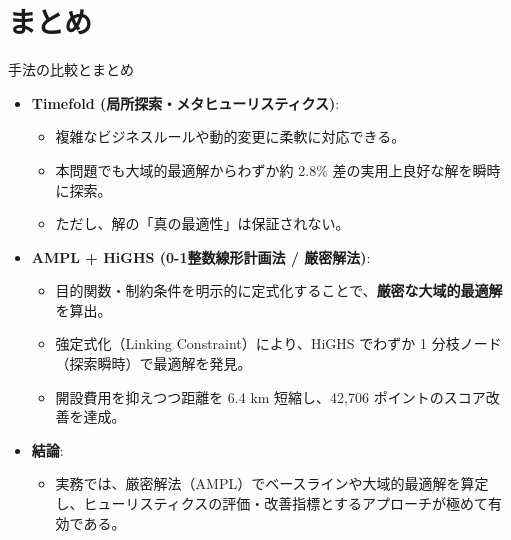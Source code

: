 \documentclass[aspectratio=169,11pt]{beamer}
\begin{document}
\section{まとめ}

\begin{frame}{手法の比較とまとめ}
  \begin{itemize}\small
    \item \textbf{Timefold (局所探索・メタヒューリスティクス)}:
      \begin{itemize}\footnotesize
        \item 複雑なビジネスルールや動的変更に柔軟に対応できる。
        \item 本問題でも大域的最適解からわずか約 2.8\% 差の実用上良好な解を瞬時に探索。
        \item ただし、解の「真の最適性」は保証されない。
      \end{itemize}
    \item \textbf{AMPL + HiGHS (0-1整数線形計画法 / 厳密解法)}:
      \begin{itemize}\footnotesize
        \item 目的関数・制約条件を明示的に定式化することで、\alert{\textbf{厳密な大域的最適解}}を算出。
        \item 強定式化（Linking Constraint）により、HiGHS でわずか 1 分枝ノード（探索瞬時）で最適解を発見。
        \item 開設費用を抑えつつ距離を 6.4 km 短縮し、42,706 ポイントのスコア改善を達成。
      \end{itemize}
    \item \textbf{結論}:
      \begin{itemize}\footnotesize
        \item 実務では、厳密解法（AMPL）でベースラインや大域的最適解を算定し、ヒューリスティクスの評価・改善指標とするアプローチが極めて有効である。
      \end{itemize}
  \end{itemize}
\end{frame}
\end{document}
